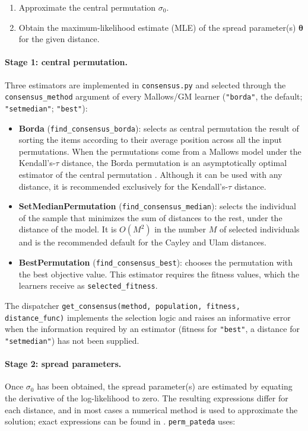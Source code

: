 \documentclass[a4paper,11pt]{article}
\begin{document}
\begin{enumerate}
 \item Approximate the central permutation $\sigma_0$.
 \item Obtain the maximum-likelihood estimate (MLE) of the spread
   parameter(s) $\bm{\theta}$ for the given distance.
\end{enumerate}

\paragraph{Stage 1: central permutation.}
Three estimators are implemented in \texttt{consensus.py} and selected through
the \texttt{consensus\_method} argument of every Mallows/GM learner
(\texttt{"borda"}, the default; \texttt{"setmedian"}; \texttt{"best"}):

\begin{itemize}
\item \textbf{Borda} \citep{Borda:1781} (\texttt{find\_consensus\_borda}):
  selects as central permutation the result of sorting the items according to
  their average position across all the input permutations.  When the
  permutations come from a Mallows model under the Kendall's-$\tau$ distance,
  the Borda permutation is an asymptotically optimal estimator of the central
  permutation \citep{Fligner_and_Verducci:1988}.  Although it can be used with
  any distance, it is recommended exclusively for the Kendall's-$\tau$
  distance.
\item \textbf{SetMedianPermutation} (\texttt{find\_consensus\_median}): selects
  the individual of the sample that minimizes the sum of distances to the rest,
  under the distance of the model.  It is $O(M^2)$ in the number $M$ of selected
  individuals and is the recommended default for the Cayley and Ulam distances.
\item \textbf{BestPermutation} (\texttt{find\_consensus\_best}): chooses the
  permutation with the best objective value.  This estimator requires the
  fitness values, which the learners receive as \texttt{selected\_fitness}.
\end{itemize}

\noindent The dispatcher \texttt{get\_consensus(method, population, fitness,
distance\_func)} implements the selection logic and raises an informative error
when the information required by an estimator (fitness for \texttt{"best"}, a
distance for \texttt{"setmedian"}) has not been supplied.

\paragraph{Stage 2: spread parameters.}
Once $\sigma_0$ has been obtained, the spread parameter(s) are estimated by
equating the derivative of the log-likelihood to zero.  The resulting expressions
differ for each distance, and in most cases a numerical method is used to
approximate the solution; exact expressions can be found in
\cite{Irurozki:2014,Irurozki_et_al:2016,Mandhani_and_Meila:2009}.
\texttt{perm\_pateda} uses:
\end{document}
